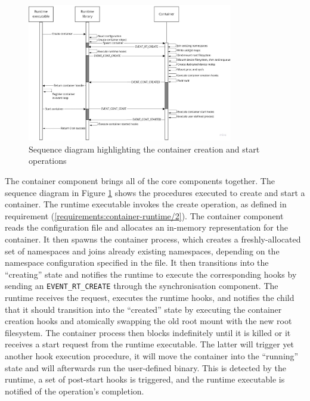 \begin{figure}[H]
    \centering
    \includegraphics[width=0.8\textwidth]{images/concept/container-create-start-sequence-diagram.jpg}
    \caption{Sequence diagram highlighting the container creation and start operations}
    \label{images:concept/container-create-start-sequence-diagram.jpg}
\end{figure}

The container component brings all of the core components together. The sequence diagram in 
Figure \ref{images:concept/container-create-start-sequence-diagram.jpg} shows the procedures 
executed to create and start a container. The runtime executable invokes the create
operation, as defined in requirement (\ref{requirements:container-runtime/2}). 
The container component reads the configuration file and allocates 
an in-memory representation for the container. It then spawns the container process, which creates 
a freshly-allocated set of namespaces and joins already existing namespaces, depending on the namespace configuration 
specified in the file.
It then transitions into the \enquote{creating} state and notifies the runtime to execute the 
corresponding hooks by sending an \verb|EVENT_RT_CREATE| through the synchronisation component. 
The runtime receives the request, executes the runtime hooks, and notifies the child that it should transition 
into the \enquote{created} state by executing the container creation hooks and atomically swapping the old root mount 
with the new root filesystem. The container process then blocks indefinitely until it is killed 
or it receives a start request from the runtime executable. The latter will trigger yet another 
hook execution procedure, it will move the container into the \enquote{running} state and will afterwards run the user-defined binary. 
This is detected 
by the runtime, a set of post-start hooks is triggered, and the runtime executable is notified 
of the operation's completion.  

